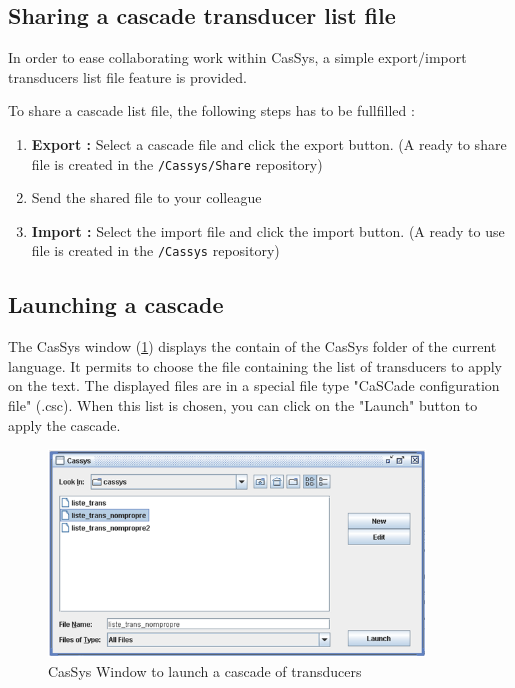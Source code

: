 \subsection{Sharing a cascade transducer list file}
\label{subsec:shareCascade}

In order to ease collaborating work within CasSys, a  simple export/import
transducers list file feature is provided.

To share a cascade list file, the following steps has to be fullfilled :
\begin{enumerate}
  \item \textbf{Export :} Select a cascade file and click the export button. (A
  ready to share file is created in the \texttt{/Cassys/Share} repository)
  \item Send the shared file to your colleague
  \item \textbf{Import :} Select the import file and click the import button.
  (A ready to use file is created in the \texttt{/Cassys} repository)
\end{enumerate}

\subsection{Launching a cascade}
\label{subsec:launchCascade}

The CasSys window (\ref{fig13-02}) displays the contain of the CasSys folder of the current language. It permits to choose 
the file containing the list of transducers to apply on the text. The displayed files are in a special file type "CaSCade configuration file" (.csc). 
When this list is chosen, you can click on the "Launch" button to apply the cascade.

\begin{figure}[!htb]
  \centering
  \includegraphics[width=10cm]{resources/img/fig13-02.png}
  \caption{CasSys Window to launch a cascade of transducers}
  \label{fig13-02}
\end{figure}


